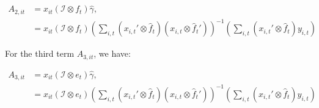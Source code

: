 \documentclass[12pt]{article}
\begin{document}
\begin{equation}
\begin{aligned}
A_{2,it} &= x_{it}(\mathcal{I} \otimes f_t) \hat{\gamma}, \\
&= x_{it}(\mathcal{I} \otimes f_t) \left( \sum_{i,t} (x_{i,t}' \otimes \hat{f}_t) (x_{i,t} \otimes \hat{f}_t') \right)^{-1} \left( \sum_{i,t} (x_{i,t}' \otimes \hat{f}_t) y_{i,t} \right)
\end{aligned}
\end{equation}

For the third term $A_{3,it}$, we have:

\begin{equation}
\begin{aligned}
A_{3,it} &= x_{it}(\mathcal{I} \otimes e_t) \hat{\gamma}, \\
&= x_{it}(\mathcal{I} \otimes e_t) \left( \sum_{i,t} (x_{i,t}' \otimes \hat{f}_t) (x_{i,t} \otimes \hat{f}_t') \right)^{-1} \left( \sum_{i,t} (x_{i,t}' \otimes \hat{f}_t) y_{i,t} \right)
\end{aligned}
\end{equation}
\end{document}
